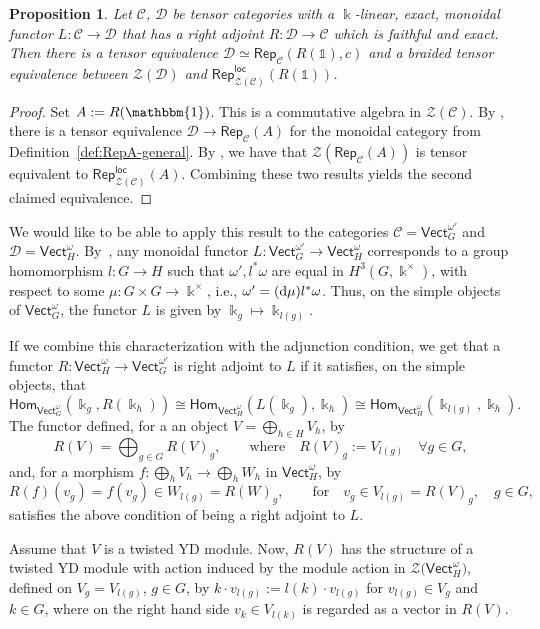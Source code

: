 \documentclass[10pt,a4paper]{amsart}
\numberwithin{equation}{section}
\newtheorem{Proposition}[Theorem]{Proposition}
 { \theoremstyle{definition}
\newtheorem{Definition}[Theorem]{Definition}
\newtheorem{Note}[Theorem]{Note}
\newtheorem{Notation}[Theorem]{Notation}
\newtheorem{Example}[Theorem]{Example}
\newtheorem{Remark}[Theorem]{Remark} }
\newcommand{\deri}{{\rm d}}
\newcommand{\Hom}{\mathsf{Hom}}
\newcommand{\one}{\mathds{1}}
\newcommand{\Rep}{\mathsf{Rep}}
\newcommand{\locmod}{\mathsf{Rep}^{\mathsf{loc}}}
\newcommand{\Vect}{\mathsf{Vect}}
\newcommand{\cC}{\mathcal{C}}
\newcommand{\cD}{\mathcal{D}}
\newcommand{\cZ}{\mathcal{Z}}
\begin{document}
\begin{Proposition}\label{prop:BN}
Let $\cC$, $\cD$ be tensor categories with a $\Bbbk$-linear, exact, monoidal functor $L \colon \cC \to \cD$ that has a right adjoint $R\colon \cD\to \cC$ which is faithful and exact. Then there is a tensor equivalence $\cD\simeq \Rep_\cC(R(\one),c)$ and a braided tensor equivalence between $\cZ(\cD)$ and $\locmod_{\cZ(\cC)}(R(\one))$.
\end{Proposition}
\begin{proof}
Set $A := R(\mathbbm{1})$. This is a commutative algebra in $\cZ(\cC)$.
By \cite[Proposition 6.1]{BN11}, there is a tensor equivalence $\cD \to \Rep_{\cC}(A)$ for the monoidal category from Definition~\ref{def:RepA-general}. By \cite[Corollary~4.5]{Sch}, we have that
$\cZ(\Rep_{\cC}(A))$ is tensor equivalent to $\locmod_{\cZ(\cC)}(A)$. Combining these two results yields the second claimed equivalence.
\end{proof}

We would like to be able to apply this result to the categories $\cC = \Vect_G^{\omega'}$ and $\cD = \Vect_H^\omega$. By~\cite[Section 2.6]{EGNO}, any monoidal functor $L\colon \Vect_G^{\omega'}\to \Vect_H^\omega$ corresponds to a group homomorphism $l\colon G\to H$ such that $\omega', l^*\omega$ are equal in $H^3(G,\Bbbk^\times)$, with respect to some $\mu\colon G\times G\to \Bbbk^\times$, i.e., $\omega'=(\deri \mu) l^*\omega$. Thus, on the simple objects of $\Vect_G^\omega$, the functor $L$ is given by $\Bbbk_g \mapsto \Bbbk_{l(g)}$.


If we combine this characterization with the adjunction condition, we get that a functor $R \colon \Vect_H^\omega \to \Vect_G^{\omega'}$ is right adjoint to $L$ if it satisfies, on the simple objects, that
\begin{equation*}
 \Hom_{\Vect_G^\omega}(\Bbbk_g,R(\Bbbk_h)) \cong \Hom_{\Vect_H^\omega}(L(\Bbbk_g),\Bbbk_h) \cong \Hom_{\Vect_H^\omega}(\Bbbk_{l(g)},\Bbbk_h).
\end{equation*}
The functor defined, for a an object $V=\bigoplus_{h\in H}V_h$, by
\[R(V)=\bigoplus_{g\in G}R(V)_{g}, \qquad \text{where}\quad R(V)_g := V_{l(g)} \quad \forall g\in G,
\] and, for a morphism $f\colon \bigoplus_h V_h\to \bigoplus_{h}W_h$ in $\Vect_H^\omega$, by
\[R(f)(v_g)= f(v_g)\in W_{l(g)}=R(W)_g, \qquad \text{for}\quad v_g\in V_{l(g)}=R(V)_g,\quad g\in G,\]
satisfies the above condition of being a right adjoint to $L$.

Assume that $V$ is a twisted YD module.
Now, $R(V)$ has the structure of a twisted YD module with action induced by the module action in $\cZ\big(\Vect_H^\omega\big)$, defined on $V_g=V_{l(g)}$, $g\in G$, by $k\cdot v_{l(g)} := l(k)\cdot v_{l(g)}$ for $v_{l(g)}\in V_g$ and $k\in G$, where on the right hand side $v_k\in V_{l(k)}$ is regarded as a vector in $R(V)$.
\end{document}
